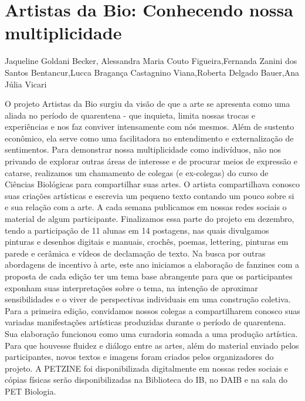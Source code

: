 

\section{Artistas da Bio: Conhecendo nossa multiplicidade}

Jaqueline Goldani Becker, Alessandra Maria Couto Figueira,Fernanda Zanini dos Santos Bentancur,Lucca Bragança Castagnino Viana,Roberta Delgado Bauer,Ana Júlia Vicari

O projeto Artistas da Bio surgiu da visão de que a arte se apresenta como uma aliada no período 
de quarentena - que inquieta, limita nossas trocas e experiências e nos faz conviver intensamente 
com nós mesmos. Além de sustento econômico, ela serve como uma facilitadora no entendimento 
e externalização de sentimentos. Para demonstrar nossa multiplicidade como indivíduos, não nos 
privando de explorar outras áreas de interesse e de procurar meios de expressão e catarse, 
realizamos um chamamento de colegas (e ex-colegas) do curso de Ciências Biológicas para 
compartilhar suas artes. O artista compartilhava conosco suas criações artísticas e escrevia um 
pequeno texto contando um pouco sobre si e sua relação com a arte. A cada semana publicamos 
em nossas redes sociais o material de algum participante. Finalizamos essa parte do projeto em 
dezembro, tendo a participação de 11 alunas em 14 postagens, nas quais divulgamos pinturas e 
desenhos digitais e manuais, crochês, poemas, lettering, pinturas em parede e cerâmica e vídeos 
de declamação de texto. Na busca por outras abordagens de incentivo à arte, este ano iniciamos a 
elaboração de fanzines com a proposta de cada edição ter um tema base abrangente para que os 
participantes exponham suas interpretações sobre o tema, na intenção de aproximar sensibilidades 
e o viver de perspectivas individuais em uma construção coletiva. Para a primeira edição, 
convidamos nossos colegas a compartilharem conosco suas variadas manifestações artísticas 
produzidas durante o período de quarentena. Sua elaboração funcionou como uma curadoria 
somada a uma produção artística. Para que houvesse fluidez e diálogo entre as artes, além do 
material enviado pelos participantes, novos textos e imagens foram criados pelos organizadores 
do projeto. A PETZINE foi disponibilizada digitalmente em nossas redes sociais e cópias físicas 
serão disponibilizadas na Biblioteca do IB, no DAIB e na sala do PET Biologia.



